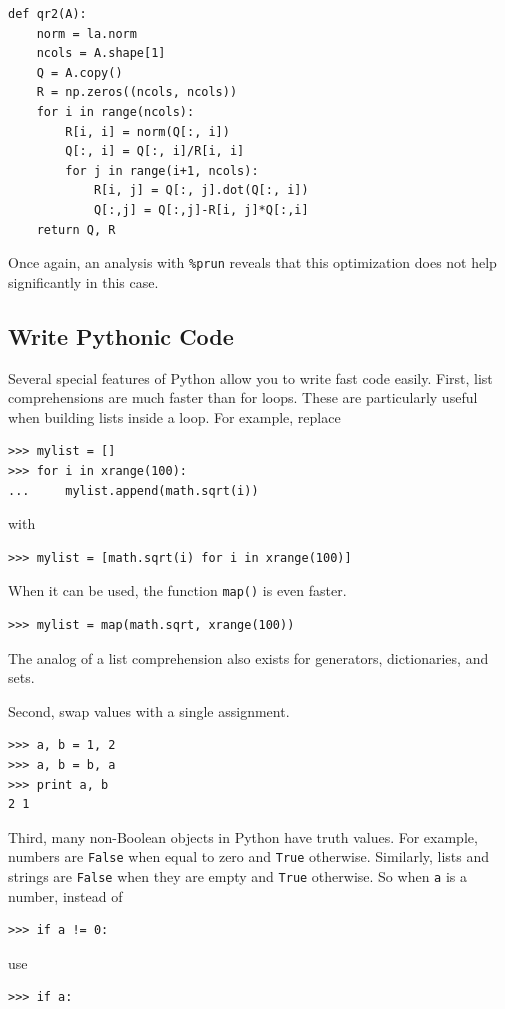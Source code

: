 \begin{lstlisting}
def qr2(A):
    norm = la.norm
    ncols = A.shape[1]
    Q = A.copy()
    R = np.zeros((ncols, ncols))
    for i in range(ncols):
        R[i, i] = norm(Q[:, i])
        Q[:, i] = Q[:, i]/R[i, i]
        for j in range(i+1, ncols):
            R[i, j] = Q[:, j].dot(Q[:, i])
            Q[:,j] = Q[:,j]-R[i, j]*Q[:,i]
    return Q, R
\end{lstlisting}
Once again, an analysis with \texttt{\%prun} reveals that this optimization does not help significantly in this case.


\subsection*{Write Pythonic Code}
Several special features of Python allow you to write fast code easily.
First, list comprehensions are much faster than for loops. These are particularly useful when building lists inside a loop.
For example, replace
\begin{lstlisting}
>>> mylist = []
>>> for i in xrange(100):
...     mylist.append(math.sqrt(i))
\end{lstlisting}
with 
\begin{lstlisting}
>>> mylist = [math.sqrt(i) for i in xrange(100)]
\end{lstlisting}
When it can be used, the function \texttt{map()} is even faster.
\begin{lstlisting}
>>> mylist = map(math.sqrt, xrange(100))
\end{lstlisting}
The analog of a list comprehension also exists for generators, dictionaries, and sets.

Second, swap values with a single assignment.
\begin{lstlisting}
>>> a, b = 1, 2
>>> a, b = b, a
>>> print a, b
2 1
\end{lstlisting}

Third, many non-Boolean objects in Python have truth values.
For example, numbers are \texttt{False} when equal to zero and \texttt{True} otherwise.
Similarly, lists and strings are \texttt{False} when they are empty and \texttt{True} otherwise.
So when \texttt{a} is a number, instead of
\begin{lstlisting}
>>> if a != 0:
\end{lstlisting}
use
\begin{lstlisting}
>>> if a:
\end{lstlisting}

